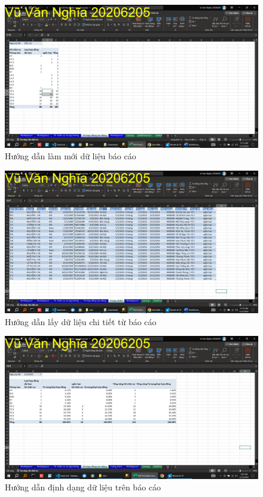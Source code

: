 \documentclass{article}
\begin{document}
\begin{figure}[H]
\centering
\includegraphics[scale = 0.15]{Bai1/HuongDan/2.png}
\caption{Hướng dẫn làm mới dữ liệu báo cáo}
\end{figure}

\begin{figure}[H]
\centering
\includegraphics[scale = 0.15]{Bai1/HuongDan/3.png}
\caption{Hướng dẫn lấy dữ liệu chi tiết từ báo cáo}
\end{figure}

\begin{figure}[H]
\centering
\includegraphics[scale = 0.15]{Bai1/HuongDan/4.png}
\caption{Hướng dẫn định dạng dữ liệu trên báo cáo}
\end{figure}
\end{document}
